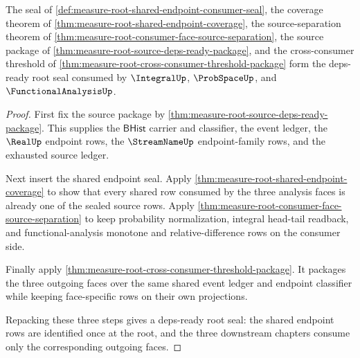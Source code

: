 \begin{theorem}
\label{thm:measure-root-shared-endpoint-deps-ready-seal}
The seal of \autoref{def:measure-root-shared-endpoint-consumer-seal}, the
coverage theorem of \autoref{thm:measure-root-shared-endpoint-coverage}, the
source-separation theorem of
\autoref{thm:measure-root-consumer-face-source-separation}, the source package
of \autoref{thm:measure-root-source-deps-ready-package}, and the
cross-consumer threshold of
\autoref{thm:measure-root-cross-consumer-threshold-package} form the
deps-ready root seal consumed by $\IntegralUp$, $\ProbSpaceUp$, and
$\FunctionalAnalysisUp$.
\end{theorem}
\begin{proof}
First fix the source package by
\autoref{thm:measure-root-source-deps-ready-package}. This supplies the
$\mathsf{BHist}$ carrier and classifier, the event ledger, the $\RealUp$
endpoint rows, the $\StreamNameUp$ endpoint-family rows, and the exhausted
source ledger.

Next insert the shared endpoint seal. Apply
\autoref{thm:measure-root-shared-endpoint-coverage} to show that every shared
row consumed by the three analysis faces is already one of the sealed source
rows. Apply \autoref{thm:measure-root-consumer-face-source-separation} to keep
probability normalization, integral head-tail readback, and
functional-analysis monotone and relative-difference rows on the consumer
side.

Finally apply \autoref{thm:measure-root-cross-consumer-threshold-package}. It
packages the three outgoing faces over the same shared event ledger and
endpoint classifier while keeping face-specific rows on their own projections.

Repacking these three steps gives a deps-ready root seal: the shared endpoint
rows are identified once at the root, and the three downstream chapters
consume only the corresponding outgoing faces.
\end{proof}
